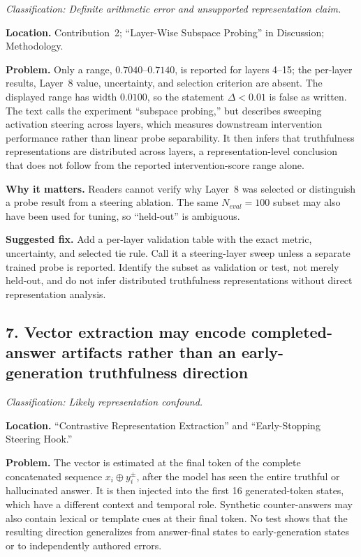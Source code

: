 \documentclass[11pt]{article}
\newcommand{\findinglabel}[1]{\textbf{#1}}
\newcommand{\classification}[1]{\textit{Classification: #1.}}
\begin{document}
\classification{Definite arithmetic error and unsupported representation claim}

\findinglabel{Location.} Contribution~2; ``Layer-Wise Subspace Probing'' in Discussion; Methodology.

\findinglabel{Problem.} Only a range, $0.7040$--$0.7140$, is reported for layers 4--15; the per-layer results, Layer~8 value, uncertainty, and selection criterion are absent.  The displayed range has width $0.0100$, so the statement $\Delta<0.01$ is false as written.  The text calls the experiment ``subspace probing,'' but describes sweeping activation steering across layers, which measures downstream intervention performance rather than linear probe separability.  It then infers that truthfulness representations are distributed across layers, a representation-level conclusion that does not follow from the reported intervention-score range alone.

\findinglabel{Why it matters.} Readers cannot verify why Layer~8 was selected or distinguish a probe result from a steering ablation.  The same $N_{eval}=100$ subset may also have been used for tuning, so ``held-out'' is ambiguous.

\findinglabel{Suggested fix.} Add a per-layer validation table with the exact metric, uncertainty, and selected tie rule.  Call it a steering-layer sweep unless a separate trained probe is reported.  Identify the subset as validation or test, not merely held-out, and do not infer distributed truthfulness representations without direct representation analysis.

\subsection*{7. Vector extraction may encode completed-answer artifacts rather than an early-generation truthfulness direction}

\classification{Likely representation confound}

\findinglabel{Location.} ``Contrastive Representation Extraction'' and ``Early-Stopping Steering Hook.''

\findinglabel{Problem.} The vector is estimated at the final token of the complete concatenated sequence $x_i\oplus y_i^{\pm}$, after the model has seen the entire truthful or hallucinated answer.  It is then injected into the first 16 generated-token states, which have a different context and temporal role.  Synthetic counter-answers may also contain lexical or template cues at their final token.  No test shows that the resulting direction generalizes from answer-final states to early-generation states or to independently authored errors.
\end{document}
